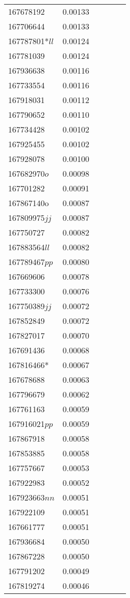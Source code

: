 \begin{landscape}
\begin{longtable}{p{1.8cm}p{0.9cm}p{2.2cm}p{1cm}p{2.8cm}p{13.4cm}}
167678192&0.00133&&&& \\
167706644&0.00133&&&& \\
167787801*$ll$&0.00124&&&& \\
167781039&0.00124&&&& \\
167936638&0.00116&&&& \\
167733554&0.00116&&&& \\
167918031&0.00112&&&& \\
167790652&0.00110&&&& \\
167734428&0.00102&&&& \\
167925455&0.00102&&&& \\
167928078&0.00100&&&& \\
167682970$o$&0.00098&&&& \\
167701282&0.00091&&&& \\
167867140o&0.00087&&&& \\
167809975$jj$&0.00087&&&& \\
167750727&0.00082&&&& \\
167883564$ll$&0.00082&&&& \\
167789467$pp$&0.00080&&&& \\
167669606&0.00078&&&& \\
167733300&0.00076&&&& \\
167750389$jj$&0.00072&&&& \\
167852849&0.00072&&&& \\
167827017&0.00070&&&& \\
167691436&0.00068&&&& \\
167816466*&0.00067&&&& \\
167678688&0.00063&&&& \\
167796679&0.00062&&&& \\
167761163&0.00059&&&& \\
167916021$pp$&0.00059&&&& \\
167867918&0.00058&&&& \\
167853885&0.00058&&&& \\
167757667&0.00053&&&& \\
167922983&0.00052&&&& \\
167923663$nn$&0.00051&&&& \\
167922109&0.00051&&&& \\
167661777&0.00051&&&& \\
167936684&0.00050&&&& \\
167867228&0.00050&&&& \\
167791202&0.00049&&&& \\
167819274&0.00046&&&& \\

\end{longtable}
\end{landscape}
